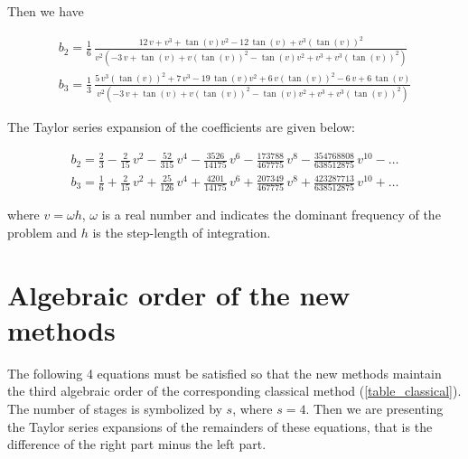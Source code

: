 \documentclass[numreferences]{kluwer}
\begin{document}
\begin{article}
Then we have

{}
\begin{equation}
\begin{array}{l}
b_2=\frac{1}{6}\,{\frac {12
\,v+{v}^{3}+\tan \left( v \right) {v}^{2}-12\,\tan \left( v \right) +{
v}^{3} \left( \tan \left( v \right)  \right) ^{2}}{{v}^{2} \left( -3\,
v+\tan \left( v \right) +v \left( \tan \left( v \right)  \right) ^{2}-
\tan \left( v \right) {v}^{2}+{v}^{3}+{v}^{3} \left( \tan \left( v
 \right)  \right) ^{2} \right) }}\\
b_3=\frac{1}{3}\,{\frac {5\,{v}^{3} \left( \tan \left( v \right)
 \right) ^{2}+7\,{v}^{3}-19\,\tan \left( v \right) {v}^{2}+6\,v
 \left( \tan \left( v \right)  \right) ^{2}-6\,v+6\,\tan \left( v
 \right) }{{v}^{2} \left( -3\,v+\tan \left( v \right) +v \left( \tan
 \left( v \right)  \right) ^{2}-\tan \left( v \right) {v}^{2}+{v}^{3}+
{v}^{3} \left( \tan \left( v \right)  \right) ^{2} \right) }}
\end{array}
\end{equation}
{}

The Taylor series expansion of the coefficients are given below:

{}
\begin{equation}
\begin{array}{l}
b_2 = \frac{2}{3}-\frac{2}{15}\,{v}^{2}-{\frac {52}{315}}\,{v}^{4}-{\frac {3526}{14175}}\,{v
}^{6}-{\frac {173788}{467775}}\,{v}^{8}-{\frac {354768808}{638512875}}
\,{v}^{10}-\ldots\\
b_3 = \frac{1}{6}+\frac{2}{15}\,{v}^{2}+{\frac {25}{126}}\,{v}^{4}+{\frac {4201}{14175}}\,{v
}^{6}+{\frac {207349}{467775}}\,{v}^{8}+{\frac {423287713}{638512875}}
\,{v}^{10}+\ldots
\end{array}
\end{equation}
{}

\noindent where  $v=\omega h$, $\omega$ is a real number and indicates the dominant frequency of the problem and $h$ is the step-length of integration.

\section{Algebraic order of the new methods}
\label{Order}

The following 4 equations must be satisfied so that the new methods maintain the third algebraic order of the
corresponding classical method (\ref{table_classical}). The number of stages is symbolized by $s$, where $s=4$. Then we are
presenting the Taylor series expansions of the remainders of these equations, that is the difference of the right part
minus the left part.


\end{article}
\end{document}
